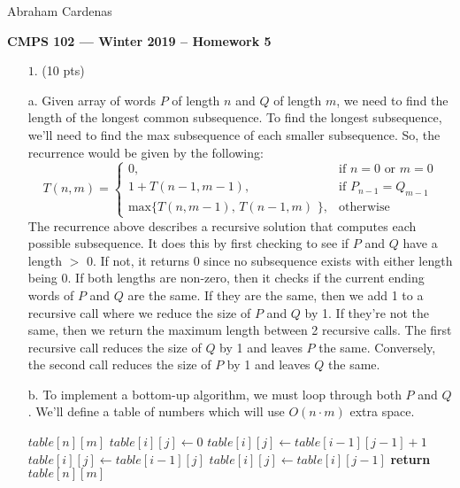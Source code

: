 \documentclass[11pt]{article}
\begin{document}
\hfill Abraham Cardenas

\begin{center}
{\bf\Large CMPS 102 --- Winter 2019 --  Homework 5}
\end{center}

\begin{itemize}

\item[$1.$] (10 pts)
\item[a.] 
Given array of words $P$ of length $n$ and $Q$ of length $m$, we need to find the length of the longest common subsequence. To find the longest subsequence, we'll need to find the max subsequence of each smaller subsequence. So, the recurrence would be given by the following:  $$\boxed{{\displaystyle T(n,m)={
\begin{cases}{0},&{\text{if }} n = 0 \text{ or } m = 0\\ 1 + T(n-1,m-1),&{\text{if }} P_{n-1} = Q_{m-1}\\ \text{max\{ } T(n, m-1) \text{, } T(n-1, m)\text{ \}},&{\text{otherwise}} 
\end{cases}}}}$$
The recurrence above describes a recursive solution that computes each possible subsequence. It does this by first checking to see if $P$ and $Q$ have a length $>$ 0. If not, it returns 0 since no subsequence exists with either length being 0. If both lengths are non-zero, then it checks if the current ending words of $P$ and $Q$ are the same. If they are the same, then we add 1 to a recursive call where we reduce the size of $P$ and $Q$ by 1. If they're not the same, then we return the maximum length between 2 recursive calls. The first recursive call reduces the size of $Q$ by 1 and leaves $P$ the same. Conversely, the second call reduces the size of $P$ by 1 and leaves $Q$ the same.

\item[b.]
To implement a bottom-up algorithm, we must loop through both $P$ and $Q$. We'll define a table of numbers which will use $O(n \cdot m)$ extra space.

\begin{algorithmic}[1]
	\State $table[n][m]$	
				\State $table[i][j] \gets 0$ 
				\State $table[i][j] \gets table[i-1][j-1] + 1$
			\Else
					\State $table[i][j] \gets table[i-1][j]$
				\Else 
					\State $table[i][j] \gets table[i][j-1]$
				\EndIf
			\EndIf
		\EndFor
	\EndFor
	\State \textbf{return} $table[n][m]$
\EndFunction
\end{algorithmic}


\end{itemize}
\end{document}
